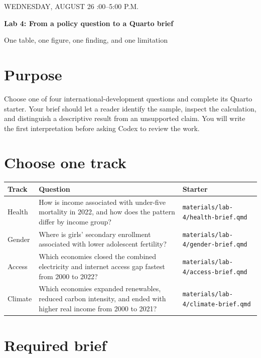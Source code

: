 \documentclass[11pt]{article}
\newcommand{\file}[1]{\nolinkurl{#1}}
\begin{document}
\begin{center}
{\small WEDNESDAY, AUGUST 26 :00--5:00 P.M.}\par
\vspace{0.6em}
{\LARGE\textbf{Lab 4: From a policy question to a Quarto brief}}\par
\vspace{0.4em}
{\large One table, one figure, one finding, and one limitation}
\end{center}

\section*{Purpose}

Choose one of four international-development questions and complete its
Quarto starter. Your brief should let a reader identify the sample, inspect
the calculation, and distinguish a descriptive result from an unsupported
claim. You will write the first interpretation before asking Codex to review
the work.

\section*{Choose one track}

\begin{tabularx}{\textwidth}{@{}p{}Y p{0.22\textwidth}@{}}
\toprule
Track & Question & Starter \\
\midrule
Health & How is income associated with under-five mortality in 2022, and how
does the pattern differ by income group? & \file{materials/lab-4/health-brief.qmd} \\
Gender & Where is girls' secondary enrollment associated with lower
adolescent fertility? & \file{materials/lab-4/gender-brief.qmd} \\
Access & Which economies closed the combined electricity and internet access
gap fastest from 2000 to 2022? & \file{materials/lab-4/access-brief.qmd} \\
Climate & Which economies expanded renewables, reduced carbon intensity, and
ended with higher real income from 2000 to 2021? & \file{materials/lab-4/climate-brief.qmd} \\
\bottomrule
\end{tabularx}

\section*{Required brief}
\end{document}
